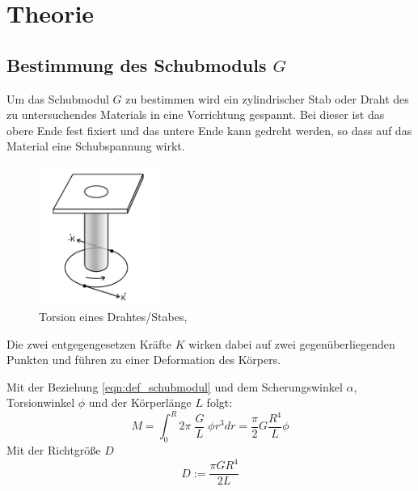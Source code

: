 \newpage
\section{Theorie}
\label{sec:theorie}

\subsection{Bestimmung des Schubmoduls $G$}
Um das Schubmodul $G$ zu bestimmen wird ein zylindrischer Stab oder Draht des zu untersuchendes
Materials in eine Vorrichtung gespannt. Bei dieser ist das obere Ende fest fixiert und das untere
Ende kann gedreht werden, so dass auf das Material eine Schubspannung wirkt.

\begin{figure}[h]
    \centering
    \includegraphics[width=0.35\textwidth, height=0.4\textwidth]{bilder/Torsion_allgemein.jpeg}
    \caption{Torsion eines Drahtes/Stabes,\cite[5]{Anleitung}}        
    \label{fig:torsion_allgemein}
\end{figure} 

Die zwei entgegengesetzen Kräfte $K$ wirken dabei auf zwei gegenüberliegenden Punkten 
und führen zu einer Deformation des Körpers.

Mit der Beziehung  \ref{eqn:def_schubmodul} 
und dem Scherungswinkel $\alpha$, Torsionwinkel $\phi$ 
und der Körperlänge $L$ folgt:
\begin{equation}
    M = \int_{0}^{R} 2\pi\;\frac{G}{L}\;\phi r^3 dr = \frac{\pi}{2}G\frac{R^4}{L}\phi
\end{equation}
Mit der Richtgröße $D$
\begin{equation}
    D:=\frac{\pi G R^4}{2L}
    \label{eqn:richtgroesse}
\end{equation}

